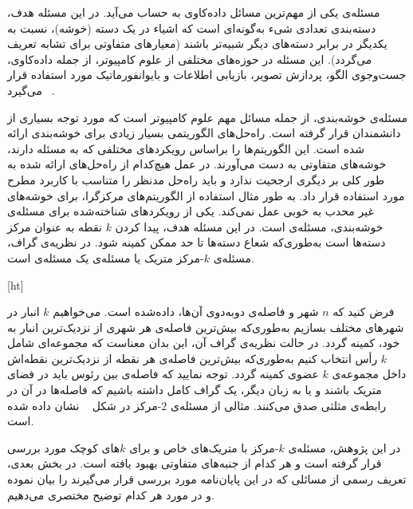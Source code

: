 


مسئله‌ی  یکی از مهم‌ترین مسائل داده‌کاوی به حساب می‌آید.
در این مسئله هدف، دسته‌بندی تعدادی شیء به‌گونه‌ای است که اشیاء در یک دسته (خوشه)، نسبت به یکدیگر در برابر دسته‌های دیگر شبیه‌تر باشند (معیارهای متفاوتی برای تشابه تعریف می‌گردد).
این مسئله در حوزه‌های مختلفی از علوم کامپیوتر، از جمله داده‌کاوی، جست‌وجوی الگو، پردازش تصویر، بازیابی اطلاعات و بایوانفورماتیک مورد استفاده قرار می‌گیرد ~.

مسئله‌ی خوشه‌بندی، از‌ جمله مسائل مهم علوم کامپیوتر است که مورد توجه بسیاری از دانشمندان قرار گرفته است.
راه‌حل‌های الگوریتمی بسیار زیادی برای خوشه‌بندی ارائه شده است.
این الگوریتم‌ها را براساس رویکرد‌های مختلفی که به مسئله دارند، خوشه‌های متفاوتی به دست می‌آورند.
در عمل هیچ‌کدام از راه‌حل‌های ارائه شده به طور کلی بر دیگری ارجحیت ندارد و باید راه‌حل مدنظر را متناسب با کاربرد مطرح مورد استفاده قرار داد.
به طور مثال استفاده از الگوریتم‌های مرکزگرا، برای خوشه‌های غیر محدب به خوبی عمل نمی‌کند.
یکی از رویکردهای شناخته‌شده برای مسئله‌ی خوشه‌بندی، مسئله‌ی  است.
در این مسئله هدف، پیدا کردن $k$ نقطه به عنوان مرکز دسته‌ها است به‌طوری‌که شعاع دسته‌ها تا حد ممکن کمینه شود.
در نظریه‌ی گراف، مسئله‌ی $k$-مرکز متریک یا مسئله‌ی  یک مسئله‌ی  است.

[ht]

فرض کنید که $n$ شهر و فاصله‌ی دوبه‌دوی آن‌ها، داده‌شده است.
می‌خواهیم $k$ انبار در شهرهای مختلف بسازیم به‌طوری‌که بیش‌ترین فاصله‌ی هر شهری از نزدیک‌ترین انبار به خود، کمینه گردد.
در حالت نظریه‌ی گراف آن، این بدان معناست که مجموعه‌ای شامل $k$ رأس انتخاب کنیم به‌طوری‌که بیش‌ترین فاصله‌ی هر نقطه از نزدیک‌ترین نقطه‌اش داخل مجموعه‌ی $k$ عضوی کمینه گردد.
توجه نمایید که فاصله‌ی بین رئوس باید در فضای متریک باشند و یا به زبان دیگر، یک گراف کامل داشته باشیم که فاصله‌ها در آن در رابطه‌ی مثلثی صدق می‌کنند.
مثالی از مسئله‌ی $2$-مرکز در شکل ~ نشان داده شده است.

در این پژوهش، مسئله‌ی $k$-مرکز با متریک‌های خاص و برای $k$های کوچک مورد بررسی قرار گرفته است و هر کدام از‌ جنبه‌های متفاوتی بهبود یافته است.
در بخش بعدی، تعریف رسمی از مسائلی که در این پایان‌نامه مورد بررسی قرار می‌گیرند را بیان نموده و در مورد هر کدام توضیح مختصری می‌دهیم.

